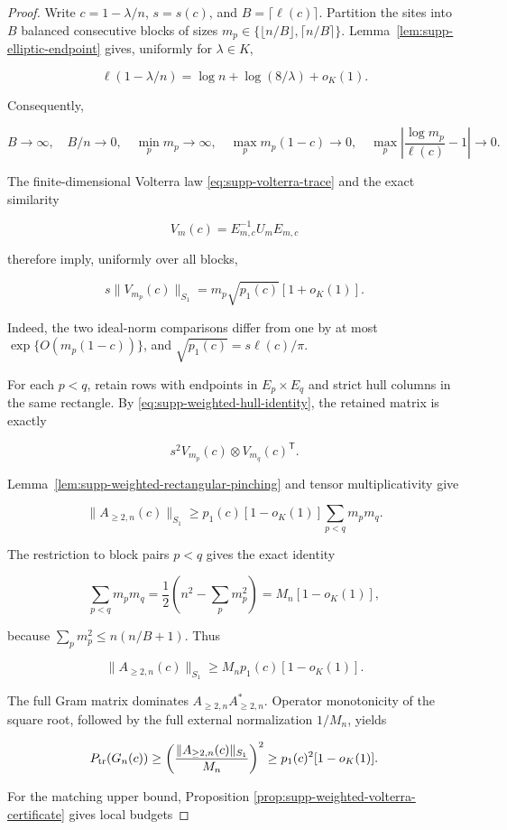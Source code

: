 \begin{proof}
Write \(c=1-\lambda/n\), \(s=s(c)\), and
\(B=\lceil\ell(c)\rceil\).  Partition the sites into \(B\) balanced
consecutive blocks of sizes \(m_p\in\{\lfloor n/B\rfloor,
\lceil n/B\rceil\}\).  Lemma~\ref{lem:supp-elliptic-endpoint} gives, uniformly
for \(\lambda\in K\),

\[
 \ell(1-\lambda/n)=\log n+\log(8/\lambda)+o_K(1).
\]

Consequently,

\[
 B\to\infty,\quad B/n\to0,\quad
 \min_p m_p\to\infty,\quad
 \max_p m_p(1-c)\to0,\quad
 \max_p\left|\frac{\log m_p}{\ell(c)}-1\right|\to0.
\]

The finite-dimensional Volterra law
\eqref{eq:supp-volterra-trace} and the exact similarity

\[
 V_m(c)=E_{m,c}^{-1}U_mE_{m,c}
\]

therefore imply, uniformly over all blocks,

\[
 s\|V_{m_p}(c)\|_{S_1}
 =m_p\sqrt{p_1(c)}[1+o_K(1)].
\]

Indeed, the two ideal-norm comparisons differ from one by at most
\(\exp\{O(m_p(1-c))\}\), and
\(\sqrt{p_1(c)}=s\ell(c)/\pi\).

For each \(p<q\), retain rows with endpoints in
\(E_p\times E_q\) and strict hull columns in the same rectangle.  By
\eqref{eq:supp-weighted-hull-identity}, the retained matrix is exactly

\[
 s^2V_{m_p}(c)\otimes V_{m_q}(c)^{\mathsf T}.
\]

Lemma~\ref{lem:supp-weighted-rectangular-pinching} and tensor
multiplicativity give

\[
 \|A_{\ge2,n}(c)\|_{S_1}
 \ge p_1(c)[1-o_K(1)]\sum_{p<q}m_pm_q.
\]

The restriction to block pairs \(p<q\) gives the exact identity

\[
 \sum_{p<q}m_pm_q
 =\frac12\left(n^2-\sum_pm_p^2\right)
 =M_n[1-o_K(1)],
\]

because \(\sum_pm_p^2\le n(n/B+1)\).  Thus

\[
 \|A_{\ge2,n}(c)\|_{S_1}
 \ge M_np_1(c)[1-o_K(1)].
\]

The full Gram matrix dominates
\(A_{\ge2,n}A_{\ge2,n}^*\).  Operator monotonicity of the square root,
followed by the full external normalization \(1/M_n\), yields

\[
 P_{\rm tr}(G_n(c))
 \ge\left(\frac{\|A_{\ge2,n}(c)\|_{S_1}}{M_n}\right)^2
 \ge p_1(c)^2[1-o_K(1)].
\]

For the matching upper bound, Proposition
\ref{prop:supp-weighted-volterra-certificate} gives local budgets


\end{proof}
